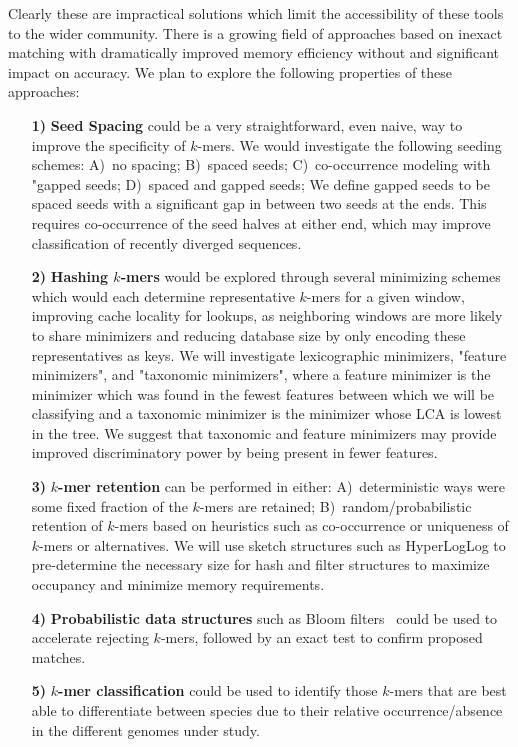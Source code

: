 \documentclass{elsarticle}
\begin{document}
Clearly these are impractical solutions which limit the accessibility
of these tools to the wider community. There is a growing field of
approaches based on inexact matching with dramatically improved memory
efficiency without and significant impact on accuracy. We plan to
explore the following properties of these approaches:
%
\begin{itemize}
%
\item[\textbf{1)}] \textbf{Seed Spacing} could be a very
straightforward, even naive, way to improve the specificity of $k$-mers.
We would investigate the following seeding schemes: A)~no spacing;
B)~spaced seeds; C)~co-occurrence modeling with
"gapped seeds; D)~spaced and gapped seeds; We define gapped seeds to be
spaced seeds with a significant gap in between two seeds at
the ends. This requires co-occurrence of the seed halves at either
end, which may improve classification of recently diverged sequences.
%
\item[\textbf{2)}] \textbf{Hashing $k$-mers} would be explored through
several minimizing schemes which would each determine representative $k$-mers
for a given window, improving cache locality for lookups, as neighboring
windows are more likely to share minimizers and reducing database size by only
encoding these representatives as keys.
We will investigate lexicographic minimizers, "feature minimizers",
and "taxonomic minimizers", where
a feature minimizer is the minimizer which was found in the fewest features
between which we will be classifying and a taxonomic minimizer is the
minimizer whose LCA is lowest in the tree.
We suggest that taxonomic and feature minimizers may provide improved
discriminatory power by being present in fewer features.
%
\item[\textbf{3)}] \textbf{$k$-mer retention} can be performed in
either: A)~deterministic ways were some fixed fraction of the $k$-mers
are retained; B)~random/probabilistic retention of $k$-mers based on
heuristics such as co-occurrence or uniqueness of $k$-mers or alternatives.
We will use sketch structures such as HyperLogLog to pre-determine the
necessary size for hash and filter structures to maximize occupancy
and minimize memory requirements.
%
\item[\textbf{4)}] \textbf{Probabilistic data structures} such as
Bloom filters~\citep{bloom1970acm} could be used to accelerate
rejecting $k$-mers, followed by an exact test to confirm proposed
matches.
%
\item[\textbf{5)}] \textbf{$k$-mer classification} could be used to
identify those $k$-mers that are best able to differentiate between
species due to their relative occurrence/absence in the different
genomes under study.
%
\end{itemize}
\end{document}

